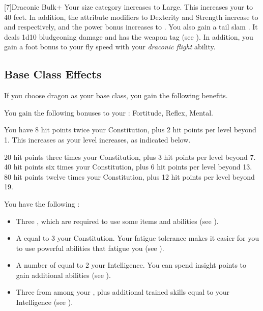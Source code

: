         [7]{Draconic Bulk+} Your size category increases to Large.
        This increases your  to 40 feet.
        In addition, the attribute modifiers to Dexterity and Strength increase to  and  respectively, and the power bonus increases to .
        You also gain a tail slam .
        It deals 1d10 bludgeoning damage and has the  weapon tag (see ).
        In addition, you gain a  foot bonus to your fly speed with your \textit{draconic flight} ability.

    \subsection{Base Class Effects}
        If you choose dragon as your base class, you gain the following benefits.

        You gain the following bonuses to your :  Fortitude,  Reflex,  Mental.

            You have 8 hit points \add twice your Constitution, plus 2 hit points per level beyond 1.
            This increases as your level increases, as indicated below.
            \begin{itemize}
                 20 hit points \add three times your Constitution, plus 3 hit points per level beyond 7.
                 40 hit points \add six times your Constitution, plus 6 hit points per level beyond 13.
                 80 hit points \add twelve times your Constitution, plus 12 hit points per level beyond 19.
            \end{itemize}

         You have the following :
        \begin{itemize}
            \item Three , which are required to use some items and abilities (see ).
            \item A  equal to 3 \add your Constitution.
                Your fatigue tolerance makes it easier for you to use powerful abilities that fatigue you (see ).
            \item A number of  equal to 2 \add your Intelligence.
                You can spend insight points to gain additional abilities (see ).
            \item Three  from among your , plus additional trained skills equal to your Intelligence (see ).
        \end{itemize}


